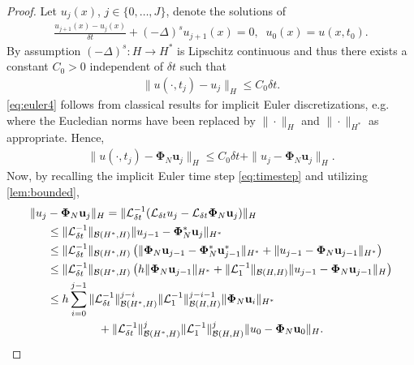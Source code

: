 \documentclass[10pt,a4paper]{article}
\numberwithin{equation}{section}
\begin{document}
\begin{proof}
Let $u_j(x)$, $j \in \{0, \dots, J\}$, denote the solutions of
\begin{align}
\frac{u_{j+1}(x) - u_j(x)}{\delta t} + (-\Delta)^s u_{j+1}(x) = 0, \;\; u_0(x) = u(x, t_0).
\end{align}
By assumption $(-\Delta)^s : H \to H^*$ is Lipschitz continuous and thus there exists a constant $C_0>0$ independent of $\delta t$ such that
\begin{align}
\| u(\cdot, t_j) - u_j \|_H \leq C_0 \delta t.
\label{eq:euler4}
\end{align}
\cref{eq:euler4} follows from classical results for implicit Euler discretizations, e.g.~\cite[Sec.~5]{Farago2013} where the Eucledian norms have been replaced by $\| \cdot \|_H$ and $\| \cdot \|_{H^*}$ as appropriate.  Hence,
\begin{align}
\label{eq:euler1}
\| u(\cdot, t_j) - {\bm \Phi}_N {\mathbf u}_j \|_H \leq C_0 \delta t + \| u_j  - {\bm \Phi}_N {\mathbf u}_j \|_H.
\end{align}
Now, by recalling the implicit Euler time step \cref{eq:timestep} and utilizing \cref{lem:bounded},
\begin{align}
\begin{split}
\label{eq:euler2}
&\| u_j  - {\bm \Phi}_N {\mathbf u}_j \|_H = \| \mathcal{L}^{-1}_{\delta t} (\mathcal{L}_{\delta t}u_j  - \mathcal{L}_{\delta t}{\bm \Phi}_N {\mathbf u}_j) \|_H\\
&\indent \leq \| \mathcal{L}^{-1}_{\delta t}\|_{\mathcal{B}(H^*,H)} \| u_{j-1} - {\bm \Phi}^*_N {\mathbf u}_j \|_{H^*}\\
&\indent \leq  \| \mathcal{L}^{-1}_{\delta t}\|_{\mathcal{B}(H^*,H)} \left( \|  {\bm \Phi}_N {\mathbf u}_{j-1}   - {\bm \Phi}^*_N {\mathbf u}^*_{j-1} \|_{H^*} + \| u_{j-1} - {\bm \Phi}_N {\mathbf u}_{j-1} \|_{H^*} \right)\\
&\indent \leq  \| \mathcal{L}^{-1}_{\delta t}\|_{\mathcal{B}(H^*,H)} \left( h \|  {\bm \Phi}_N {\mathbf u}_{j-1} \|_{H^*} + \| \mathcal{L}_1^{-1} \|_{\mathcal{B}(H,H)} \| u_{j-1} - {\bm \Phi}_N {\mathbf u}_{j-1} \|_{H} \right) \\
&\indent \leq  
h \sum_{i=0}^{j-1} \| \mathcal{L}^{-1}_{\delta t}\|^{j-i}_{\mathcal{B}(H^*,H)}  \| \mathcal{L}^{-1}_1\|^{j-i-1}_{\mathcal{B}(H,H)} \|  {\bm \Phi}_N {\mathbf u}_{i} \|_{H^*} \\
&\indent \indent \indent \indent +   \| \mathcal{L}^{-1}_{\delta t}\|^{j}_{\mathcal{B}(H^*,H)}  \| \mathcal{L}^{-1}_1\|^{j}_{\mathcal{B}(H,H)} \| u_{0} - {\bm \Phi}_N {\mathbf u}_{0} \|_H.

\end{split}
\end{align}
\end{proof}
\end{document}
